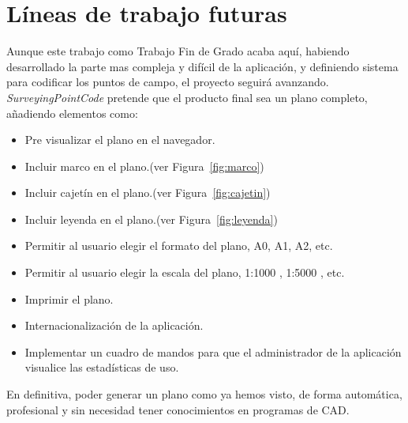 \section{Líneas de trabajo futuras}

Aunque este trabajo como Trabajo Fin de Grado acaba aquí, habiendo desarrollado la parte mas compleja y difícil de la aplicación, y definiendo sistema para codificar los puntos de campo, el proyecto seguirá avanzando. \emph{SurveyingPointCode} pretende que el producto final sea un plano completo, añadiendo elementos como:



\begin{itemize}
\item Pre visualizar el plano en el navegador.
\item Incluir marco en el plano.(ver Figura~\ref{fig:marco})
\item Incluir cajetín en el plano.(ver Figura~\ref{fig:cajetin})
\item Incluir leyenda en el plano.(ver Figura~\ref{fig:leyenda})
\item Permitir al usuario elegir el formato del plano, A0, A1, A2, etc.
\item Permitir al usuario elegir la escala del plano, 1:1000 , 1:5000 , etc.
\item Imprimir el plano.
\item Internacionalización de la aplicación.
\item Implementar un cuadro de mandos para que el administrador de la aplicación visualice las estadísticas de uso.
\end{itemize}


En definitiva, poder generar un plano como ya hemos visto, de forma automática, profesional y sin necesidad tener conocimientos en programas de CAD.
